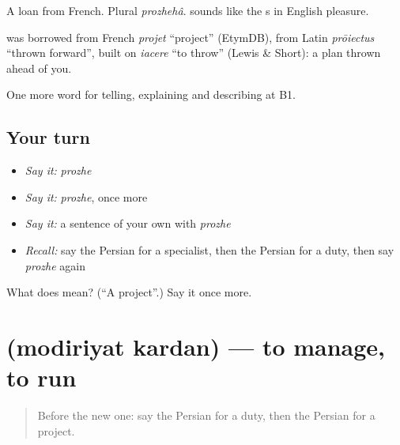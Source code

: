 A loan from French. Plural \emph{prozhehâ}.  sounds like the s in English pleasure.

\begin{cousinweb}
\textbf{} was borrowed from French \emph{projet} \textquotedblleft{}project\textquotedblright{} (EtymDB), from Latin \emph{prōiectus} \textquotedblleft{}thrown forward\textquotedblright{}, built on \emph{iacere} \textquotedblleft{}to throw\textquotedblright{} (Lewis \& Short): a plan thrown ahead of you.
\end{cousinweb}

\begin{grammarlens}[title={What you've built}]
One more word for telling, explaining and describing at B1.
\end{grammarlens}

\subsection*{Your turn}
\begin{itemize}
\raggedright
  \item \emph{Say it:} \emph{prozhe}
  \item \emph{Say it:} \emph{prozhe}, once more
  \item \emph{Say it:} a sentence of your own with \emph{prozhe}
  \item \emph{Recall:} say the Persian for a specialist, then the Persian for a duty, then say \emph{prozhe} again
\end{itemize}

\begin{tcolorbox}[breakable,colback=teal!4,colframe=teal!35!black,title={Before you move on}]
What does  mean? (\textquotedblleft{}A project\textquotedblright{}.) Say it once more.
\end{tcolorbox}
\section[\texorpdfstring{\fa{مدیریت} \fa{کردن} (modiriyat kardan)}{مدیریت کردن (modiriyat kardan)}]{  (modiriyat kardan) — to manage, to run}

\label{lesson:FA-C382-modiriyyat-kardan}



\begin{quote}
Before the new one: say the Persian for a duty, then the Persian for a project.
\end{quote}

